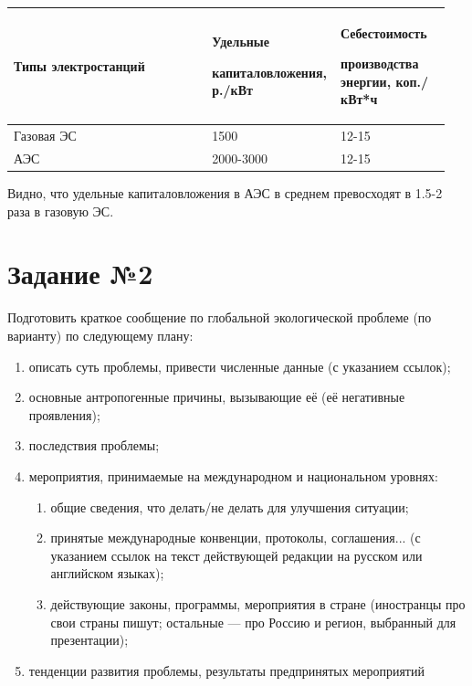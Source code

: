 \documentclass[a4paper,12pt]{article}
\begin{document}
	
	\begin{center}
		\begin{longtable}[h!]{|p{0.45\linewidth}|p{0.25\linewidth}|p{ 0.25\linewidth}|}
			\hline
			{Типы электростанций} & {Удельные
			
		капиталовложения, р./кВт} & {Себестоимость
	
производства энергии, коп./кВт*ч}\\
			\hline
			{Газовая ЭС} & {1500} & {12-15}\\
			\hline
			{АЭС} & {2000-3000} & {12-15}\\
			\hline
		\end{longtable}
	\end{center}

	Видно, что удельные капиталовложения в АЭС в среднем превосходят в 1.5-2 раза в газовую ЭС.
	
	\section*{Задание №2}
	
	Подготовить краткое сообщение по глобальной экологической проблеме
	(по варианту) по следующему плану:
	
	\begin{enumerate}
		\item описать суть проблемы, привести численные данные (с указанием
		ссылок);
		\item основные антропогенные причины, вызывающие её (её негативные
		проявления);
		\item последствия проблемы;
		\item мероприятия, принимаемые на международном и национальном уровнях:
		
		\begin{enumerate}
			\item общие сведения, что делать/не делать для улучшения ситуации;
			\item принятые международные конвенции, протоколы, соглашения... (с
			указанием ссылок на текст действующей редакции на русском или
			английском языках);
			\item действующие законы, программы, мероприятия в стране (иностранцы
			про свои страны пишут; остальные — про Россию и регион, выбранный
			для презентации);
		\end{enumerate}
		\item тенденции развития проблемы, результаты предпринятых мероприятий
	\end{enumerate}
\end{document}
